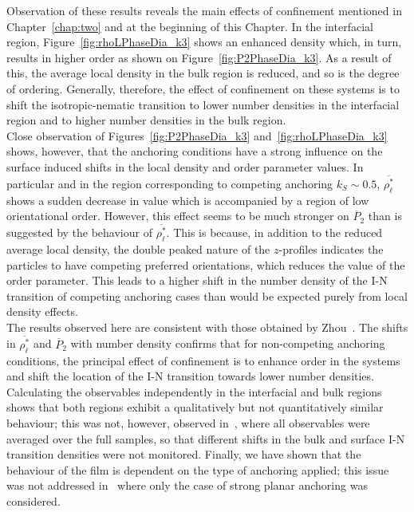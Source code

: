 Observation of these results reveals the main effects of confinement mentioned in
Chapter~\ref{chap:two} and at the beginning of this Chapter.
In the interfacial region, Figure~\ref{fig:rhoLPhaseDia_k3} shows an enhanced density
which, in turn, results in higher order as shown on Figure~\ref{fig:P2PhaseDia_k3}. As a result
of this, the average local density in the bulk region is reduced, and so is the degree of
ordering. Generally, therefore, the effect of confinement on these systems is to shift the 
isotropic-nematic transition to lower number densities in the interfacial region and to higher 
number densities in the bulk region.\\ 

Close observation of Figures~\ref{fig:P2PhaseDia_k3} and~\ref{fig:rhoLPhaseDia_k3}
shows, however, that the anchoring conditions have a strong influence on the surface induced 
shifts in the local
density and order parameter values. 
In particular and in the region corresponding to competing anchoring \ie $k_S \sim 0.5$,
$\overline{\rho^{*}_\ell}$ shows a sudden decrease in value which is accompanied by a region
of low orientational order. However, this effect seems to be much stronger on 
$\overline{P}_2$ than is suggested by the behaviour of $\overline{\rho^{*}_\ell}$. This is
because,
in addition to the reduced average local density, the double peaked nature of the $z$-profiles
indicates the particles to have competing preferred orientations, which reduces
the value of the order parameter. This leads to a higher shift in the number density of the 
I-N transition of competing anchoring cases than would be expected purely from local density
effects.\\

The results observed here are consistent with those obtained by Zhou~\etal\cite{ZhouChen03}. The
shifts in $\overline{\rho^{*}_\ell}$ and $\overline{P}_2$ with number density confirms 
that for non-competing anchoring conditions, 
the principal  effect of confinement is to enhance order in the systems and shift the 
location of the I-N transition towards lower number densities. 
Calculating the observables independently in the interfacial and bulk regions
shows that both regions exhibit a qualitatively but not quantitatively similar behaviour; this
was not, however, observed in~\cite{ZhouChen03}, where all observables were averaged
over the full samples, so that different shifts in the bulk and surface I-N 
transition densities were not monitored. 
Finally, we have shown that the  behaviour of the film is dependent on the type 
of anchoring applied; this issue was not addressed in~\cite{ZhouChen03} where only the 
case of strong planar anchoring was considered.



